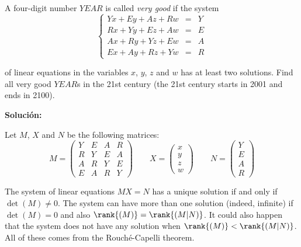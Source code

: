 \documentclass[../../main.tex]{subfiles}
\begin{document}
  \begin{shaded}
    A four-digit number $YEAR$ is called \textit{very good} if the system
    $$
    \left \{
      \begin{matrix}
        Y x + E y + A z + R w & = & Y \\
        R x + Y y + E z + A w & = & E \\
        A x + R y + Y z + E w & = & A \\
        E x + A y + R z + Y w & = & R
      \end{matrix}
    \right .
    $$

    of linear equations in the variables $x$, $y$, $z$ and $w$ has at least two solutions. Find all very good $YEAR$s in the 21st century (the 21st century starts in 2001 and ends in 2100).
  \end{shaded}

  \textbf{Solución:}

  Let $M$, $X$ and $N$ be the following matrices:
  $$
  M = \left(
    \begin{matrix}
      Y & E & A & R \\
      R & Y & E & A \\
      A & R & Y & E \\
      E & A & R & Y
    \end{matrix}
  \right) \quad\quad X =
  \left(
    \begin{matrix}
      x \\
      y \\
      z \\
      w
    \end{matrix}
  \right) \quad\quad N =
  \left(
    \begin{matrix}
      Y \\
      E \\
      A \\
      R
    \end{matrix}
  \right)
  $$

  The system of linear equations $M X = N$ has a unique solution if and only if $\det{(M)} \ne 0$. The system can have more than one solution (indeed, infinite) if $\det{(M)} = 0$ and also $\rank{(M)} = \rank{(M | N)}$. It could also happen that the system does not have any solution when $\rank{(M)} < \rank{(M | N)}$. All of these comes from the Rouché-Capelli theorem.
\end{document}
